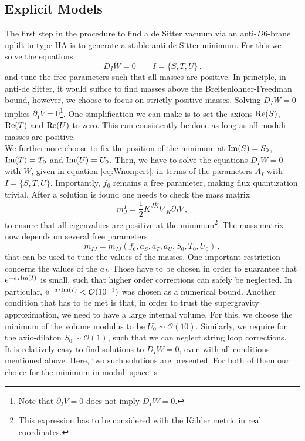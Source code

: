 \documentclass[a4paper,12pt]{report}
\newcommand{\be}{\begin{equation}}
\newcommand{\ee}{\end{equation}}
\def\rme{{\rm e}}
\def\rmre{{\rm Re}}
\def\rmim{{\rm Im}}
\begin{document}
\subsection{Explicit Models}
\label{sec:uplfitbraneexamples}
The first step in the procedure to find a de Sitter vacuum via an anti-$D6$-brane uplift in type IIA is to generate a stable anti-de Sitter minimum. For this we solve the equations
\be 
D_I W = 0 \qquad I = \{S,T,U\}\,.
\ee
and tune the free parameters such that all masses are positive. In principle, in anti-de Sitter, it would suffice to find masses above the Breitenlohner-Freedman bound, however, we choose to focus on strictly positive masses. Solving $D_I W = 0$ implies $\partial_I V=0$\footnote{Note that $\partial_I V=0$ does not imply $D_I W = 0$.}. One simplification we can make is to set the axions $\rmre(S)$, $\rmre(T)$ and $\rmre(U)$ to zero. This can consistently be done as long as all moduli masses are positive.\\
We furthermore choose to fix the position of the minimum at $\rmim (S) = S_0$, $\rmim (T) = T_0$ and $\rmim (U) = U_0$. Then, we have to solve the equations $D_IW = 0$ with $W$, given in equation \eqref{eq:Wnonpert}, in terms of the parameters $A_I$ with $I = \{S,T,U\}$. Importantly, $f_6$ remains a free parameter, making flux quantization trivial. After a solution is found one needs to check the mass matrix
\be 
m_J^I = \frac{1}{2} K^{J\bar{K}} \nabla_{\bar{K}} \partial_I V\,,
\ee 
to ensure that all eigenvalues are positive at the minimum\footnote{This expression has to be considered with the Kähler metric in real coordinates.}. The mass matrix now depends on several free parameters
\be 
m_{IJ} = m_{IJ}(f_6,a_S,a_T,a_U,S_0,T_0,U_0)\,,
\ee
that can be used to tune the values of the masses. One important restriction concerns the values of the $a_I$. Those have to be chosen in order to guarantee that $\rme^{-a_I \rmim (I)}$ is small, such that higher order corrections can safely be neglected. In particular, $\rme^{-a_I \rmim (I)} < \mathcal{O}(10^{-1})$ was chosen as a numerical bound. Another condition that has to be met is that, in order to trust the supergravity approximation, we need to have a large internal volume. For this, we choose the minimum of the volume modulus to be $U_0 \sim \mathcal{O}(10)$. Similarly, we require for the axio-dilaton $S_0 \sim \mathcal{O}(1)$, such that we can neglect string loop corrections.\\
It is relatively easy to find solutions to $D_IW=0$, even with all conditions mentioned above. Here, two such solutions are presented. For both of them our choice for the minimum in moduli space is
\end{document}
